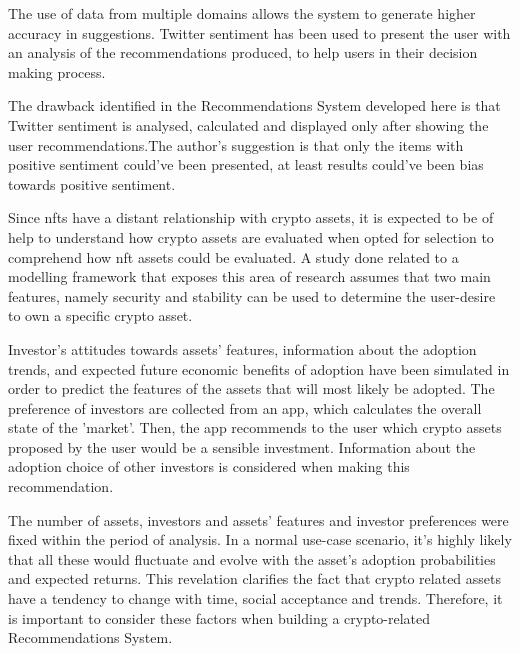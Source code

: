 The use of data from multiple domains allows the system to generate higher accuracy in suggestions. Twitter sentiment has been used to present the user with an analysis of the recommendations produced, to help users in their decision making process.

The drawback identified in the Recommendations System developed here is that Twitter sentiment is analysed, calculated and displayed only after showing the user recommendations.The author's suggestion is that only the items with positive sentiment could've been presented, at least results could've been bias towards positive sentiment.

\bigbreak

Since \gls{nft}s have a distant relationship with crypto assets, it is expected to be of help to understand how crypto assets are evaluated when opted for selection to comprehend how \gls{nft} assets could be evaluated. A study done related to a modelling framework that exposes this area of research \autocite{bartolucci_model_2020} assumes that two main features, namely security and stability can be used to determine the user-desire to own a specific crypto asset. 

Investor's attitudes towards assets’ features, information about the adoption trends, and expected future economic benefits of adoption have been simulated in order to predict the features of the assets that will most likely be adopted. The preference of investors are collected from an app, which calculates the overall state of the 'market'. Then, the app recommends to the user which crypto assets proposed by the user would be a sensible investment. Information about the adoption choice of other investors is considered when making this recommendation.

The number of assets, investors and assets' features and investor preferences were fixed within the period of analysis. In a normal use-case scenario, it's highly likely that all these would fluctuate and evolve with the asset's adoption probabilities and expected returns. This revelation clarifies the fact that crypto related assets have a tendency to change with time, social acceptance and trends. Therefore, it is important to consider these factors when building a crypto-related Recommendations System.




